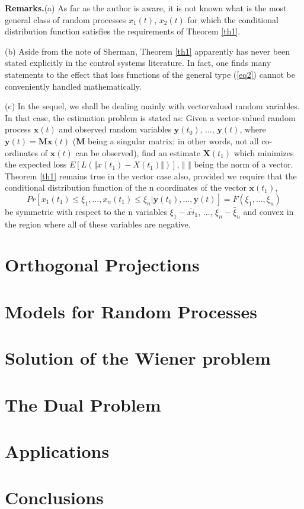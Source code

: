 \documentclass{article}
\begin{document}
\textbf{Remarks.}(a) As far as the author is aware, it is not known what is the most general class of random processes ${x_1(t)}$, ${x_2(t)}$ for which the conditional distribution function satisfies the requirements of Theorem \ref{th1}.

(b) Aside from the note of Sherman, Theorem \ref{th1} apparently has never been stated explicitly in the control systems literature. In fact, one finds many statements to the effect that loss functions of the general type (\ref{eq2}) cannot be conveniently handled mathematically.

(c) In the sequel, we shall be dealing mainly with vectorvalued random variables. In that case, the estimation problem is stated as: Given a vector-valued random process ${\mathbf{x}(t)}$ and observed random variables $\mathbf{y}(t_0)$, $\dotsc$, $\mathbf{y}(t)$, where $\mathbf{y}(t) = \mathbf{M}\mathbf{x}(t)$ ($\mathbf{M}$ being a singular matrix; in other words, not all co-ordinates of $\mathbf{x}(t)$ can be observed), find an estimate $\mathbf{X}(t_1)$ which minimizes the expected loss $E[L(\Vert x(t_1) - X(t_1)\Vert)]$, $\Vert$ $\Vert$ being the norm of a vector. Theorem \ref{th1} remains true in the vector case also, provided we require that the conditional distribution function of the n coordinates of the vector $\mathbf{x}(t_1)$,
\begin{equation*}
Pr[x_1(t_1) \le \xi_1,\dotsc,x_n(t_1) \le \xi_n \vert \mathbf{y}(t_0),\dotsc,\mathbf{y}(t)]=F(\xi_1,\dotsc,\xi_n)
\end{equation*}
be symmetric with respect to the n variables $\xi_1 - \bar{xi}_1$, $\dotsc$, $\xi_n - \bar{\xi}_n$ and convex in the region where all of these variables are negative.
\section{Orthogonal Projections}
\section{Models for Random Processes}
\section{Solution of the Wiener problem}
\section{The Dual Problem}
\section{Applications}
\section{Conclusions}
\end{document}
